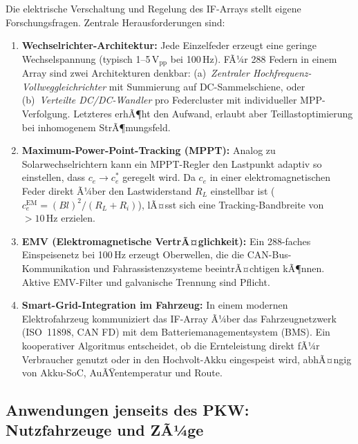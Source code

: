 ﻿\documentclass[12pt, a4paper]{report}
\theoremstyle{definition}
\theoremstyle{remark}
\begin{document}
Die elektrische Verschaltung und Regelung des IF-Arrays stellt eigene
Forschungsfragen. Zentrale Herausforderungen sind:

\begin{enumerate}[leftmargin=2em]
  \item \textbf{Wechselrichter-Architektur:} Jede Einzelfeder erzeugt eine
        geringe Wechselspannung (typisch 1--5\,V$_{\text{pp}}$ bei 100\,Hz).
        FÃ¼r 288 Federn in einem Array sind zwei Architekturen denkbar:
        (a)~\emph{Zentraler Hochfrequenz-Vollweggleichrichter} mit Summierung
        auf DC-Sammelschiene, oder (b)~\emph{Verteilte DC/DC-Wandler} pro
        Federcluster mit individueller MPP-Verfolgung. Letzteres erhÃ¶ht den
        Aufwand, erlaubt aber Teillastoptimierung bei inhomogenem StrÃ¶mungsfeld.

  \item \textbf{Maximum-Power-Point-Tracking (MPPT):} Analog zu
        Solar\-wechsel\-richtern kann ein MPPT-Regler den Lastpunkt adaptiv
        so einstellen, dass $c_e \to c_e^*$ geregelt wird. Da $c_e$ in einer
        elektromagnetischen Feder direkt Ã¼ber den Lastwiderstand $R_L$ einstellbar
        ist ($c_e^{\text{EM}} = (Bl)^2/(R_L+R_i)$), lÃ¤sst sich eine
        Tracking-Bandbreite von $> 10\,\text{Hz}$ erzielen.

  \item \textbf{EMV (Elektromagnetische VertrÃ¤glichkeit):} Ein 288-faches
        Einspeisenetz bei 100\,Hz erzeugt Oberwellen, die die CAN-Bus-Kommunikation
        und Fahrassistenzsysteme beeintrÃ¤chtigen kÃ¶nnen. Aktive EMV-Filter
        und galvanische Trennung sind Pflicht.

  \item \textbf{Smart-Grid-Integration im Fahrzeug:} In einem modernen
        Elektro\-fahrzeug kommuniziert das IF-Array Ã¼ber das Fahrzeugnetzwerk
        (ISO~11898, CAN FD) mit dem Batterie\-management\-system (BMS). Ein
        kooperativer Algoritmus entscheidet, ob die Ernteleistung direkt
        fÃ¼r Verbraucher genutzt oder in den Hochvolt-Akku eingespeist wird,
        abhÃ¤ngig von Akku-SoC, AuÃŸentemperatur und Route.
\end{enumerate}

\subsection{Anwendungen jenseits des PKW: Nutzfahrzeuge und ZÃ¼ge}
\label{ssec:ausblick_nutzfahrzeuge}
\end{document}
